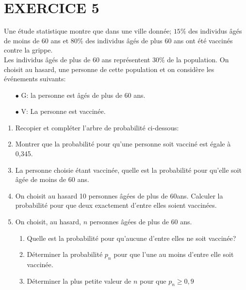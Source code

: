 \documentclass[13pts]{report}
\begin{document}
\section*{EXERCICE 5}
	Une étude statistique montre que dans une ville donnée; $15\%$ des individus âgés de moins de 60 ans et $80\%$ des individus âgés de plus 60 ans ont été vaccinés contre la grippe.\\ Les individus âgés de plus de 60 ans représentent $30\%$ de la population. On choisit au hasard, une personne de cette population et on considère les événements suivants:\\
	\begin{enumerate}
		\item[$\bullet$] G: \fg la personne est âgés de plus de 60 ans\og{}.
		\item[$\bullet$] V: \fg La personne est vaccinée\og{}.
	\end{enumerate}
	\begin{enumerate}
		\item Recopier et compléter l'arbre de probabilité ci-dessous:\\
		\begin{center}
		\end{center}
	\item Montrer que la probabilité pour qu'une personne soit vacciné est égale à 0,345.
	\item La personne choisie étant vaccinée, quelle est la probabilité pour qu'elle soit âgée de moins de 60 ans.
	\item On choisit au hasard 10 personnes âgées de plus de 60ans. Calculer la probabilité pour que deux exactement d'entre elles soient vaccinées.
	\item On choisit, au hasard, $n$ personnes âgées de plus de 60 ans.
		\begin{enumerate}
			\item Quelle est la probabilité pour qu'aucune d'entre elles ne soit vaccinée?
			\item Déterminer la probabilité $p_n$ pour que l'une au moins d'entre elle soit vaccinée.
			\item Déterminer la plus petite valeur de $n$ pour que $p_n \geq 0,9$
		\end{enumerate}
	\end{enumerate}
\end{document}
